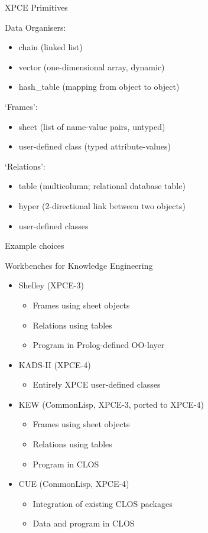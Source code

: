 \begin{sli}{XPCE Primitives}

Data Organisers:

\begin{itemize}
    \item chain (linked list)
    \item vector (one-dimensional array, dynamic)
    \item hash_table (mapping from object to object)
\end{itemize}

`Frames':

\begin{itemize}
    \item sheet (list of name-value pairs, untyped)
    \item user-defined class (typed attribute-values)
\end{itemize}

`Relations':

\begin{itemize}
    \item table (multicolumn; relational database table)
    \item hyper (2-directional link between two objects)
    \item user-defined classes
\end{itemize}
\end{sli}


\begin{sli}{Example choices}

Workbenches for Knowledge Engineering

\begin{itemize}
    \item Shelley (XPCE-3)
    \begin{itemize}
        \item Frames using sheet objects
	\item Relations using tables
	\item Program in Prolog-defined OO-layer
    \end{itemize}
    \item KADS-II (XPCE-4)
    \begin{itemize}
        \item Entirely XPCE user-defined classes
    \end{itemize}
    \item KEW (CommonLisp, XPCE-3, ported to XPCE-4)
    \begin{itemize}
        \item Frames using sheet objects
	\item Relations using tables
	\item Program in CLOS
    \end{itemize}
    \item CUE (CommonLisp, XPCE-4)
    \begin{itemize}
	\item Integration of existing CLOS packages
	\item Data and program in CLOS
    \end{itemize}
\end{itemize}
\end{sli}


